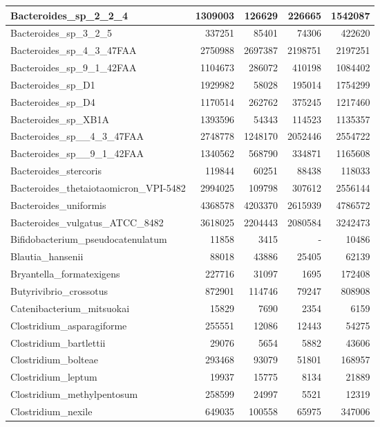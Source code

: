 \documentclass[12pt,a4paper]{article}
\begin{document}
\begin{table}[ht]
\begin{center}
\begin{tabular}{|l*{4}{|r}|}
Bacteroides\_sp\_2\_2\_4 & 1309003 & 126629 & 226665 & 1542087 \\ \hline
Bacteroides\_sp\_3\_2\_5 & 337251 & 85401 & 74306 & 422620 \\ \hline
Bacteroides\_sp\_4\_3\_47FAA & 2750988 & 2697387 & 2198751 & 2197251 \\ \hline
Bacteroides\_sp\_9\_1\_42FAA & 1104673 & 286072 & 410198 & 1084402 \\ \hline
Bacteroides\_sp\_D1 & 1929982 & 58028 & 195014 & 1754299 \\ \hline
Bacteroides\_sp\_D4 & 1170514 & 262762 & 375245 & 1217460 \\ \hline
Bacteroides\_sp\_XB1A & 1393596 & 54343 & 114523 & 1135357 \\ \hline
Bacteroides\_sp\_\_4\_3\_47FAA & 2748778 & 1248170 & 2052446 & 2554722 \\ \hline
Bacteroides\_sp\_\_9\_1\_42FAA & 1340562 & 568790 & 334871 & 1165608 \\ \hline
Bacteroides\_stercoris & 119844 & 60251 & 88438 & 118033 \\ \hline
Bacteroides\_thetaiotaomicron\_VPI-5482 & 2994025 & 109798 & 307612 & 2556144 \\ \hline
Bacteroides\_uniformis & 4368578 & 4203370 & 2615939 & 4786572 \\ \hline
Bacteroides\_vulgatus\_ATCC\_8482 & 3618025 & 2204443 & 2080584 & 3242473 \\ \hline
Bifidobacterium\_pseudocatenulatum & 11858 & 3415 & - & 10486 \\ \hline
Blautia\_hansenii & 88018 & 43886 & 25405 & 62139 \\ \hline
Bryantella\_formatexigens & 227716 & 31097 & 1695 & 172408 \\ \hline
Butyrivibrio\_crossotus & 872901 & 114746 & 79247 & 808908 \\ \hline
Catenibacterium\_mitsuokai & 15829 & 7690 & 2354 & 6159 \\ \hline
Clostridium\_asparagiforme & 255551 & 12086 & 12443 & 54275 \\ \hline
Clostridium\_bartlettii & 29076 & 5654 & 5882 & 43606 \\ \hline
Clostridium\_bolteae & 293468 & 93079 & 51801 & 168957 \\ \hline
Clostridium\_leptum & 19937 & 15775 & 8134 & 21889 \\ \hline
Clostridium\_methylpentosum & 258599 & 24997 & 5521 & 12319 \\ \hline
Clostridium\_nexile & 649035 & 100558 & 65975 & 347006 \\ \hline

\end{tabular}
\end{center}
\end{table}
\end{document}
